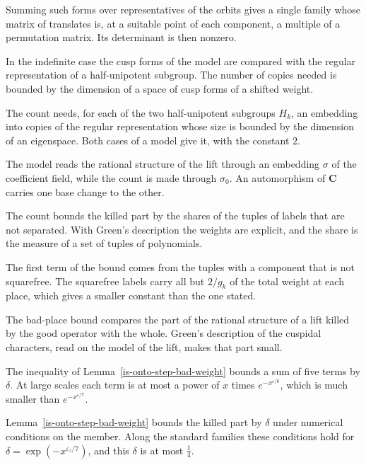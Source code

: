 Summing such forms over representatives of the orbits gives a single family whose matrix of translates
is, at a suitable point of each component, a multiple of a permutation matrix. Its determinant is then
nonzero.

In the indefinite case the cusp forms of the model are compared with the regular representation of a
half-unipotent subgroup. The number of copies needed is bounded by the dimension of a space of cusp
forms of a shifted weight.

The count needs, for each of the two half-unipotent subgroups $H_k$, an embedding into copies of the
regular representation whose size is bounded by the dimension of an eigenspace. Both cases of a model
give it, with the constant $2$.

The model reads the rational structure of the lift through an embedding $\sigma$ of the coefficient
field, while the count is made through $\sigma_0$. An automorphism of $\mathbf C$ carries one base
change to the other.

The count bounds the killed part by the shares of the tuples of labels that are not separated. With
Green's description the weights are explicit, and the share is the measure of a set of tuples of
polynomials.

The first term of the bound comes from the tuples with a component that is not squarefree. The
squarefree labels carry all but $2/g_k$ of the total weight at each place, which gives a smaller
constant than the one stated.

The bad-place bound compares the part of the rational structure of a lift killed by the good operator
with the whole. Green's description of the cuspidal characters, read on the model of the lift, makes
that part small.

The inequality of Lemma~\ref{is-onto-step-bad-weight} bounds a sum of five terms by $\delta$. At large
scales each term is at most a power of $x$ times $e^{-x^{\varepsilon/6}}$, which is much smaller than
$e^{-x^{\varepsilon/7}}$.

Lemma~\ref{is-onto-step-bad-weight} bounds the killed part by $\delta$ under numerical conditions on the member. Along
the standard families these conditions hold for $\delta=\exp(-x^{\varepsilon_z/7})$, and this
$\delta$ is at most $\frac14$.

